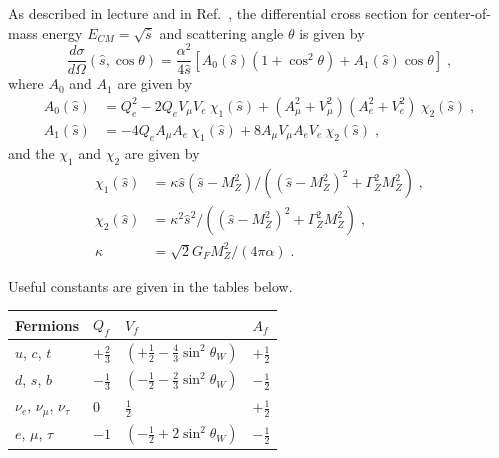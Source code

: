 As described in lecture and in Ref.~\cite{Papaefstathiou:2014mya}, the differential cross section for center-of-mass energy $E_{CM} = \sqrt{\hat s}$ and scattering angle $\theta$ is given by
\begin{equation}
  \label{eq:partonicxs}
  \frac{ d\sigma } { d \Omega }(\hat s, \cos\theta) = \frac{\alpha^2}{4 \hat{s} } \left[ A_0 (\hat s) ( 1  + \cos ^2 \theta ) + A_1(\hat s) \cos \theta \right] \;,
\end{equation}
where $A_0$ and $A_1$ are given by
\begin{align}
  A_0(\hat s) & = Q_e^2 - 2 Q_e V_\mu  V_e ~\chi_1(\hat s) + (A_\mu^2 + V_\mu^2)  (A_e^2 + V_e^2)  ~\chi_2(\hat s)\;, \nonumber \\
  A_1(\hat s) & = -4 Q_e  A_\mu A_e ~\chi_1(\hat s) + 8 A_\mu V_\mu A_e V_e ~ \chi_2(\hat s)\;,
\end{align}
and the $\chi_1$ and $\chi_2$ are given by
\begin{align}
  \chi_1 (\hat{s}) & = \kappa \hat{s} ( \hat{s} - M_Z^2 ) / (  (\hat{s}-M_Z^2)^2 + \Gamma_Z^2 M_Z^2 ) \;, \nonumber \\
  \chi_2 (\hat{s}) & = \kappa^2 \hat{s}^2 / (  (\hat{s}-M_Z^2)^2 + \Gamma_Z^2 M_Z^2 ) \;, \nonumber                 \\
  \kappa           & = \sqrt{2} G_F M_Z^2 / (4 \pi \alpha) \;.
\end{align}

Useful constants are given in the tables below.

\begin{center}
  \begin{tabular}{llll}
    Fermions                       & $Q_f$          & $V_f$                                            & $A_f$          \\ \hline
    $u$, $c$, $t$                  & $+\frac{2}{3}$ & $(+\frac{1}{2} - \frac{4}{3} \sin ^2 \theta_W )$ & $+\frac{1}{2}$ \\
    $d$, $s$, $b$                  & $-\frac{1}{3}$ & $(-\frac{1}{2} - \frac{2}{3} \sin ^2 \theta_W )$ & $-\frac{1}{2}$ \\
    $\nu_e$, $\nu_\mu$, $\nu_\tau$ & $0$            & $\frac{1}{2}$                                    & $+\frac{1}{2}$ \\
    $e$, $\mu$, $\tau$             & $-1$           & $(-\frac{1}{2} + 2 \sin ^2 \theta_W )$           & $-\frac{1}{2}$ \\
  \end{tabular}
\end{center}

